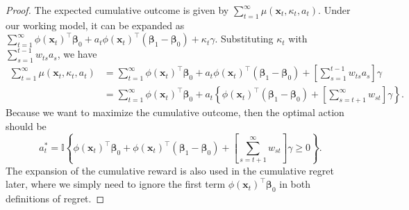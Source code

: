 \documentclass[12pt]{article}
\begin{document}
\begin{proof}
The expected cumulative outcome is given by $\sum_{t=1}^\infty \mu(\bm{x}_t,  \kappa_t, a_t)$. Under our working model, it can be expanded as
$\sum_{t=1}^\infty \phi(\bm{x}_t)^{\top}\bm{\beta}_0+a_t\phi(\bm{x}_t)^{\top}(\bm{\beta}_1-\bm{\beta}_0)+ \kappa_t \gamma$.
Substituting $ \kappa_t$ with $\sum_{s=1}^{t-1} w_{ts} a_s$, we have
\begin{align*}
    \sum_{t=1}^\infty \mu(\bm{x}_t, \kappa_t, a_t) 
    &= \sum_{t=1}^\infty \phi(\bm{x}_t)^{\top}\bm{\beta}_0+a_t\phi(\bm{x}_t)^{\top}(\bm{\beta}_1-\bm{\beta}_0)+ \left[ \sum_{s=1}^{t-1} w_{ts} a_s \right] \gamma\\
    &= \sum_{t=1}^{\infty} \phi(\bm{x}_t)^{\top} \bm{\beta}_0 + a_t\left\{\phi(\bm{x}_t)^{\top} (\bm{\beta}_1 - \bm{\beta}_0) + \left[\sum_{s=t+1}^\infty w_{st} \right] \gamma \right\}.
\end{align*}
Because we want to maximize the cumulative outcome, then the optimal action should be
\begin{equation*}
    a_t^\ast = \mathbb{I}\left\{\phi(\bm{x}_t)^{\top} \bm{\beta}_0 + \phi(\bm{x}_t)^{\top} (\bm{\beta}_1 - \bm{\beta}_0) + \left[\sum_{s=t+1}^\infty w_{st} \right] \gamma \ge 0 \right\}.
\end{equation*}
The expansion of the cumulative reward is also used in the cumulative regret later, where we simply need to ignore the first term $\phi(\bm{x}_t)^{\top} \bm{\beta}_0$ in both definitions of regret.
\end{proof}
\end{document}
